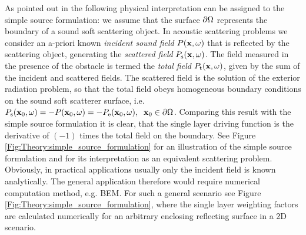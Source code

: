 
\vspace{3mm}
As pointed out in \cite{Fazi2013:Equivalent_scattering, Fazi2010, Schultz2014:Comparing_approaches, Zotter2013:uniqueness} the following physical interpretation can be assigned to the simple source formulation: 
we assume that the surface $\partial \Omega$ represents the boundary of a sound soft scattering object. 
In acoustic scattering problems we consider an a-priori known \emph{incident sound field} $P(\mathbf{x},\omega)$ that is reflected by the scattering object, generating the \emph{scattered field} $P_{\mathrm{s}}(\mathbf{x},\omega)$.
The field measured in the presence of the obstacle is termed the \emph{total field} $P_{\mathrm{t}}(\mathbf{x},\omega)$, given by the sum of the incident and scattered fields.
The scattered field is the solution of the exterior radiation problem, so that the total field obeys homogeneous boundary conditions on the sound soft scatterer surface, i.e. $P_{\mathrm{s}}(\mathbf{x}_0,\omega) = -P(\mathbf{x}_0,\omega) = - P_{\mathrm{e}}(\mathbf{x}_0,\omega), \hspace{.2cm} \mathbf{x}_0 \in \partial \Omega$.
Comparing this result with the simple source formulation it is clear, that the single layer driving function is the derivative of $(-1)$ times the total field on the boundary.
See Figure \ref{Fig:Theory:simple_source_formulation} for an illustration of the simple source formulation and for its interpretation as an equivalent scattering problem.
Obviously, in practical applications usually only the incident field is known analytically.
The general application therefore would require numerical computation method, e.g. BEM. For such a general scenario see Figure \ref{Fig:Theory:simple_source_formulation}, where the single layer weighting factors are calculated numerically for an arbitrary enclosing reflecting surface in a 2D scenario.


